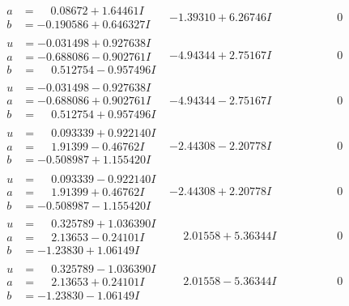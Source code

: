 \documentclass[1p]{elsarticle_modified}
\theoremstyle{definition}
\begin{document}
$$\begin{array}{c|c|c}
\begin{aligned}
a &= \phantom{-}0.08672 + 1.64461 I \\
b &= -0.190586 + 0.646327 I\end{aligned}
 & -1.39310 + 6.26746 I & \phantom{-0.000000 } 0 \\ \hline\begin{aligned}
u &= -0.031498 + 0.927638 I \\
a &= -0.688086 - 0.902761 I \\
b &= \phantom{-}0.512754 - 0.957496 I\end{aligned}
 & -4.94344 + 2.75167 I & \phantom{-0.000000 } 0 \\ \hline\begin{aligned}
u &= -0.031498 - 0.927638 I \\
a &= -0.688086 + 0.902761 I \\
b &= \phantom{-}0.512754 + 0.957496 I\end{aligned}
 & -4.94344 - 2.75167 I & \phantom{-0.000000 } 0 \\ \hline\begin{aligned}
u &= \phantom{-}0.093339 + 0.922140 I \\
a &= \phantom{-}1.91399 - 0.46762 I \\
b &= -0.508987 + 1.155420 I\end{aligned}
 & -2.44308 - 2.20778 I & \phantom{-0.000000 } 0 \\ \hline\begin{aligned}
u &= \phantom{-}0.093339 - 0.922140 I \\
a &= \phantom{-}1.91399 + 0.46762 I \\
b &= -0.508987 - 1.155420 I\end{aligned}
 & -2.44308 + 2.20778 I & \phantom{-0.000000 } 0 \\ \hline\begin{aligned}
u &= \phantom{-}0.325789 + 1.036390 I \\
a &= \phantom{-}2.13653 - 0.24101 I \\
b &= -1.23830 + 1.06149 I\end{aligned}
 & \phantom{-}2.01558 + 5.36344 I & \phantom{-0.000000 } 0 \\ \hline\begin{aligned}
u &= \phantom{-}0.325789 - 1.036390 I \\
a &= \phantom{-}2.13653 + 0.24101 I \\
b &= -1.23830 - 1.06149 I\end{aligned}
 & \phantom{-}2.01558 - 5.36344 I & \phantom{-0.000000 } 0 \\ \hline\begin{aligned}

\end{aligned}
\end{array}$$
\end{document}
